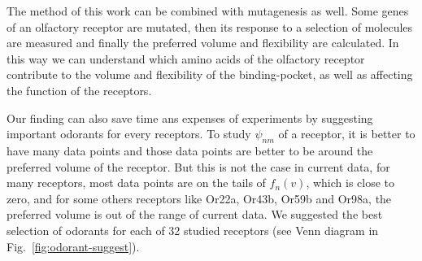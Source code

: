 \documentclass[11pt]{paper} %
\newcommand{\numberofreceptors}{32 }
\begin{document}
The method of this work can be combined with mutagenesis as well. 
Some genes of an olfactory receptor are mutated, 
then its response to a selection of molecules are measured and finally the preferred volume and flexibility are calculated.
In this way we can understand which amino acids of the olfactory receptor contribute to the volume and flexibility of the binding-pocket, 
as well as affecting the function of the receptors.

Our finding can also save time ans expenses of experiments by suggesting important odorants for every receptors.
To study $\psi_{nm}$ of a receptor, it is better to have many data points and those data points are better to be around the preferred volume of the receptor.
But this is not the case in current data, 
for many receptors, most data points are on the tails of $f_n(v)$, which is close to zero,
and for some others receptors like Or22a, Or43b, Or59b and Or98a, 
the preferred volume is out of the range of current data.
We suggested the best selection of odorants for each of \numberofreceptors studied receptors (see Venn diagram in Fig.~\ref{fig:odorant-suggest}).
\end{document}
